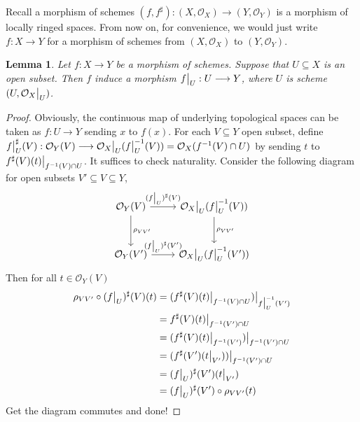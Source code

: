 \documentclass{ctexart}
\newtheorem{lemma}{Lemma}[section]
\begin{document}
Recall a morphism of schemes $(f, f^{\sharp}): (X, \mathcal{O}_{X}) \longrightarrow (Y, \mathcal{O}_{Y})$ is a morphism of locally ringed spaces.
From now on, for convenience, we would just write $f: X \longrightarrow Y$ for a morphism of schemes from $(X, \mathcal{O}_{X})$ to $(Y, \mathcal{O}_{Y})$.
\begin{lemma}
    Let $f: X \longrightarrow Y$ be a morphism of schemes.
    Suppose that $U \subseteq X$ is an open subset.
    Then $f$ induce a morphism $f\big{|}_{U} : U \longrightarrow Y$, where $U$ is scheme $(U, \mathcal{O}_{X}\big{|}_{U})$.
    \label{Lemma 2.1}
\end{lemma}
\begin{proof}
    Obviously, the continuous map of underlying topological spaces can be taken as $f: U \longrightarrow Y$ sending $x$ to $f(x)$.
    For each $V \subseteq Y$ open subset, define $f\big{|}_{U}^{\sharp}(V): \mathcal{O}_{Y}(V) \longrightarrow \mathcal{O}_{X}\big{|}_{U}(f\big{|}_{U}^{-1}(V)) = \mathcal{O}_{X}(f^{-1}(V) \cap U)$ by sending $t$ to $f^{\sharp}(V)(t)\big{|}_{f^{-1}(V) \cap U}$.
    It suffices to check naturality.
    Consider the following diagram for open subsets $V' \subseteq V \subseteq Y$,
    \begin{equation*}
        \begin{tikzcd}[row sep = large]
            \mathcal{O}_{Y}(V) \arrow[r, "(f\big{|}_{U})^{\sharp}(V)"] \arrow[d, "\rho_{VV'}"] &
            \mathcal{O}_{X}\big{|}_{U}(f\big{|}_{U}^{-1}(V)) \arrow[d, "\rho_{VV'}"] \\
            \mathcal{O}_{Y}(V') \arrow[r, "(f\big{|}_{U})^{\sharp}(V')"] &
            \mathcal{O}_{X}\big{|}_{U}(f\big{|}_{U}^{-1}(V'))
        \end{tikzcd}
    \end{equation*}
    Then for all $t\in \mathcal{O}_{Y}(V)$
    \begin{equation*}
        \begin{split}
            \rho_{VV'} \circ (f\big{|}_{U})^{\sharp}(V)(t) & = (f^{\sharp}(V)(t)\big{|}_{f^{-1}(V) \cap U})\big{|}_{f\big{|}_{U}^{-1}(V')} \\
            & = f^{\sharp}(V)(t)\big{|}_{f^{-1}(V') \cap U} \\
            & = (f^{\sharp}(V)(t)\big{|}_{f^{-1}(V')})\big{|}_{f^{-1}(V') \cap U} \\
            & = (f^{\sharp}(V')(t\big{|}_{V'}))\big{|}_{f^{-1}(V') \cap U} \\
            & = (f\big{|}_{U})^{\sharp}(V')(t\big{|}_{V'}) \\
            & = (f\big{|}_{U})^{\sharp}(V') \circ \rho_{VV'}(t)
        \end{split}
    \end{equation*}
    Get the diagram commutes and done!
\end{proof}
\end{document}
